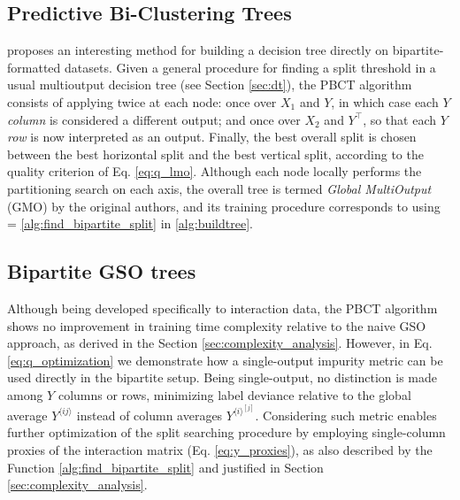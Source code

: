 \documentclass[conference]{IEEEtran}
\newcommand{\el}[1]{^{[#1]}}
\newcommand{\mel}[1]{^{\langle #1 \rangle}}
\newcommand{\T}{^\intercal}
\begin{document}
\subsection{Predictive Bi-Clustering Trees}
\label{sec:bipartite_trees}

\cite{Pliakos_2018} proposes an interesting method for building a decision tree directly on bipartite-formatted datasets. Given a general procedure \FindSplit for finding a split threshold in a usual multioutput decision tree (see Section \ref{sec:dt}), the PBCT algorithm consists of applying \FindSplit twice at each node: once over $X_1$ and $Y$, in which case each $Y$ \emph{column} is considered a different output; and once over $X_2$ and $Y\T$, so that each $Y$ \emph{row} is now interpreted as an output. Finally, the best overall split is chosen between the best horizontal split and the best vertical split, according to the quality criterion of Eq. \ref{eq:q_lmo}.
Although each node locally performs the partitioning search on each axis, the overall tree is termed \emph{Global MultiOutput} (GMO) by the original authors, and its training procedure corresponds to using \FindSplit = \ref{alg:find_bipartite_split} in \ref{alg:buildtree}.

\subsection{Bipartite GSO trees}

Although being developed specifically to interaction data, the PBCT algorithm shows no improvement in training time complexity relative to the naive GSO approach, as derived in the Section \ref{sec:complexity_analysis}. However, in Eq. \ref{eq:q_optimization} we demonstrate how a single-output impurity metric can be used directly in the bipartite setup. Being single-output, no distinction is made among $Y$ columns or rows, minimizing label deviance relative to the global average $Y\mel{ij}$ instead of column averages $Y\mel i\el j$. Considering such metric enables further optimization of the split searching procedure by employing single-column proxies of the interaction matrix (Eq. \ref{eq:y_proxies}), as also described by the Function \ref{alg:find_bipartite_split} and justified in Section \ref{sec:complexity_analysis}.
\end{document}
